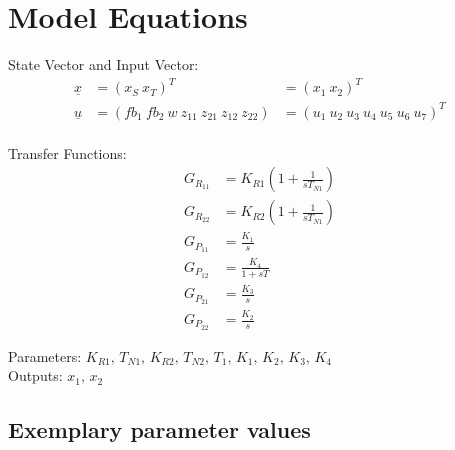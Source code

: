 \documentclass[10pt,a4paper]{article}
\begin{document}
	
	\begin{tabular}{ll}

	\end{tabular}
	
	
	\section{Model Equations} %
	
	State Vector and Input Vector:
	\begin{align*}
		\underline{x} &= (x_S \ x_T)^T &= (x_1 \ x_2)^T \\
		\underline{u} &= (fb_1 \ fb_2 \ w \ z_{11} \ z_{21} \ z_{12} \ z_{22})
					  &= (u_1 \ u_2 \ u_3 \ u_4 \ u_5 \ u_6 \ u_7)^T \\
	\end{align*}
	
	\noindent Transfer Functions:			
	\begin{subequations}
	\begin{align}
		G_{R_{11}} &= K_{R1}\left(1 + \frac{1}{sT_{N1}}\right) \\ 
		G_{R_{22}} &= K_{R2}\left(1 + \frac{1}{sT_{N1}}\right) \\
		G_{P_{11}} &= \frac{K_1}{s} \\
		G_{P_{12}} &= \frac{K_4}{1 + sT} \\
		G_{P_{21}} &= \frac{K_3}{s} \\
		G_{P_{22}} &= \frac{K_2}{s} 				
	\end{align}
	\end{subequations}

	\noindent
	Parameters: $K_{R1}, \, T_{N1}, \, K_{R2}, \, T_{N2}, \, T_1, \, K_1, \, K_2, \, K_3, \, K_4$ %
	\\
	Outputs: $x_1, \, x_2$ \\%
	

	
	\subsection{Exemplary parameter values}
	
\end{document}
